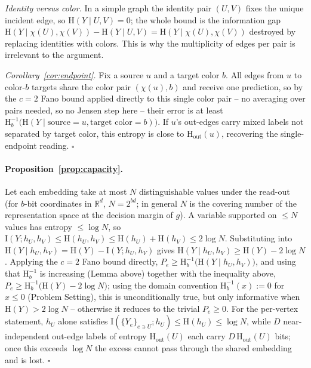 \documentclass[letterpaper]{article} %
\newcommand{\Hh}{\mathrm{H}}
\newcommand{\MI}{\mathrm{I}}
\newcommand{\outdeg}{\mathrm{out}}
\theoremstyle{plain}
\theoremstyle{definition}
\begin{document}
\emph{Identity versus color.} In a simple graph the identity pair $(U,V)$ fixes the unique incident edge, so $\Hh(Y\mid U,V)=0$; the whole bound is the information gap $\Hh(Y\mid \chi(U),\chi(V))-\Hh(Y\mid U,V)=\Hh(Y\mid \chi(U),\chi(V))$ destroyed by replacing identities with colors. This is why the multiplicity of edges per pair is irrelevant to the argument.

\emph{Corollary~\ref{cor:endpoint}.} Fix a source $u$ and a target color $b$. All edges from $u$ to color-$b$ targets share the color pair $(\chi(u),b)$ and receive one prediction, so by the $c=2$ Fano bound applied directly to this single color pair -- no averaging over pairs needed, so no Jensen step here -- their error is at least $\Hh_b^{-1}\big(\Hh(Y\mid \text{source}{=}u,\text{target color}{=}b)\big)$. If $u$'s out-edges carry mixed labels not separated by target color, this entropy is close to $\Hh_\outdeg(u)$, recovering the single-endpoint reading. $\square$

\paragraph{Proposition~\ref{prop:capacity}.}
Let each embedding take at most $N$ distinguishable values under the read-out (for $b$-bit coordinates in $\mathbb{R}^d$, $N=2^{bd}$; in general $N$ is the covering number of the representation space at the decision margin of $g$). A variable supported on $\le N$ values has entropy $\le \log N$, so $\MI(Y;h_U,h_V)\le \Hh(h_U,h_V)\le \Hh(h_U)+\Hh(h_V)\le 2\log N$. Substituting into $\Hh(Y\mid h_U,h_V)=\Hh(Y)-\MI(Y;h_U,h_V)$ gives $\Hh(Y\mid h_U,h_V)\ge \Hh(Y)-2\log N$. Applying the $c=2$ Fano bound directly, $P_e\ge \Hh_b^{-1}\big(\Hh(Y\mid h_U,h_V)\big)$, and using that $\Hh_b^{-1}$ is increasing (Lemma above) together with the inequality above, $P_e\ge \Hh_b^{-1}\big(\Hh(Y)-2\log N\big)$; using the domain convention $\Hh_b^{-1}(x):=0$ for $x\le0$ (Problem Setting), this is unconditionally true, but only informative when $\Hh(Y)>2\log N$ -- otherwise it reduces to the trivial $P_e\ge0$. For the per-vertex statement, $h_U$ alone satisfies $\MI(\{Y_e\}_{e\ni U}; h_U)\le \Hh(h_U)\le \log N$, while $D$ near-independent out-edge labels of entropy $\Hh_\outdeg(U)$ each carry $D\,\Hh_\outdeg(U)$ bits; once this exceeds $\log N$ the excess cannot pass through the shared embedding and is lost. $\square$
\end{document}
